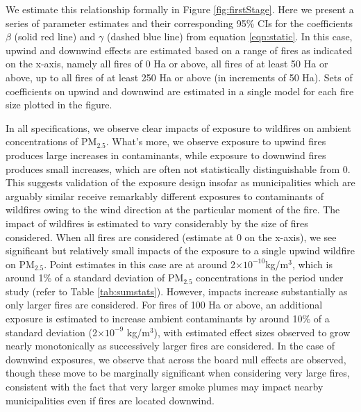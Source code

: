 \documentclass[11pt]{article}
\begin{document}
\begin{spacing}{1.5}
We estimate this relationship formally in Figure \ref{fig:firstStage}.  Here we present a series of parameter estimates and their corresponding 95\% CIs for the coefficients $\beta$ (solid red line) and $\gamma$ (dashed blue line) from equation \ref{eqn:static}.  In this case, upwind and downwind effects are estimated based on a range of fires as indicated on the x-axis, namely all fires of 0 Ha or above, all fires of at least 50 Ha or above, up to all fires of at least 250 Ha or above (in increments of 50 Ha). Sets of coefficients on upwind and downwind are estimated in a single model for each fire size plotted in the figure.

In all specifications, we observe clear impacts of exposure to wildfires on ambient concentrations of PM$_{2.5}$.  What's more, we observe exposure to upwind fires produces large increases in contaminants, while exposure to downwind fires produces small increases, which are often not statistically distinguishable from 0. This suggests validation of the exposure design insofar as municipalities which are arguably similar receive remarkably different exposures to contaminants of wildfires owing to the wind direction at the particular moment of the fire. The impact of wildfires is estimated to vary considerably by the size of fires considered.  When all fires are considered (estimate at 0 on the x-axis), we see significant but relatively small impacts of the exposure to a single upwind wildfire on PM$_{2.5}$.  Point estimates in this case are at around 2$\times10^{-10} $kg/m$^3$, which is around 1\% of a standard deviation of PM$_2.5$ concentrations in the period under study (refer to Table \ref{tab:sumstats}).  However, impacts increase substantially as only larger fires are considered.  For fires of 100 Ha or above, an additional exposure is estimated to increase ambient contaminants by around 10\% of a standard deviation (2$\times10^{-9}$ kg/m$^3$), with estimated effect sizes observed to grow nearly monotonically as successively larger fires are considered.  In the case of downwind exposures, we observe that across the board null effects are observed, though these move to be marginally significant when considering very large fires, consistent with the fact that very larger smoke plumes may impact nearby municipalities even if fires are located downwind.


\end{spacing}
\end{document}
